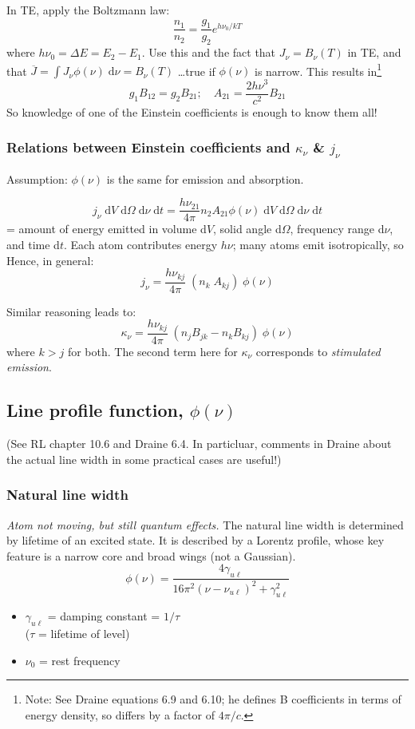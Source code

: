 \documentclass[11pt]{article}
\newcommand{\mar}[1]{\hspace{0pt}\marginpar{-\textcolor{black}{#1}-}}
\newcommand{\mynotes}[1]{{\fontfamily{cmss}\selectfont \textit{#1}}}
\begin{document}
\mar{30}In TE, apply the Boltzmann law:
\[
    \frac{n_{1}}{n_{2}} = \frac{g_{1}}{g_{2}} e^{h\nu_{0} / kT}
    \]
where $h\nu_{0} = \Delta{E} = E_{2} - E_{1}$.
Use this and the fact that $J_{\nu} = B_{\nu}(T)$ in TE, and that
$\overline{J} = \int J_{\nu} \phi(\nu)\; \mathrm{d}\nu = B_{\nu}(T)$
\ldots true if $\phi(\nu)$ is narrow. This results in\footnote{
    Note: See Draine equations 6.9 and 6.10; he defines B coefficients
    in terms of energy density, so differs by a factor of $4\pi/c$.}
\[
    g_{1} B_{12} = g_{2} B_{21}; \quad
    A_{21} = \frac{2h\nu^{3}}{c^{2}} B_{21}
    \]
So knowledge of one of the Einstein coefficients is enough to know
them all!

\subsubsection{Relations between Einstein coefficients and
$\kappa_{\nu}$ \& $j_{\nu}$}
Assumption: $\phi(\nu)$ is the same for emission and absorption.

\[
    j_{\nu} \;\mathrm{d}V \;\mathrm{d}\Omega \;\mathrm{d}\nu \;\mathrm{d}t
    = \frac{h\nu_{21}}{4\pi} n_{2} A_{21} \phi(\nu) \;
    \mathrm{d}V \;\mathrm{d}\Omega \;\mathrm{d}\nu \;\mathrm{d}t
    \]
= amount of energy emitted in volume d$V$, solid angle d$\Omega$,
frequency range d$\nu$, and time d$t$.
Each atom contributes energy $h\nu$; many atoms emit isotropically, so
Hence, in general:
\[
    \boxed{ j_{\nu} = \frac{h\nu_{kj}}{4\pi}\; (n_{k}\; A_{kj})\; \phi(\nu) }
    \]

Similar reasoning leads to:
\[
    \boxed{ \kappa_{\nu} = \frac{h\nu_{kj}}{4\pi}\;
        (n_{j} B_{jk} - n_{k} B_{kj})\; \phi(\nu) }
    \]
where $ k > j $ for both. \mar{31}The second term here for $\kappa_{\nu}$
corresponds to \textit{stimulated emission}.

\subsection{Line profile function, $\phi(\nu)$}
(See RL chapter 10.6 and Draine 6.4. In particluar, comments in Draine about
the actual line width in some practical cases are useful!)

\subsubsection{Natural line width}
\mynotes{Atom not moving, but still quantum effects.}
The natural line width is determined by lifetime of an excited state.
It is described by a Lorentz profile, whose key feature is a narrow core and
broad wings (not a Gaussian).
\[
    \phi(\nu)
    = \frac{4\gamma_{u\ell}}{16\pi^{2} (\nu - \nu_{u\ell})^{2} +
    \gamma_{u\ell}^{2} }
    \]
\begin{itemize}
    \item $\gamma_{u\ell}$ = damping constant = $1/\tau$\\
        ($\tau$ = lifetime of level)
    \item $\nu_{0}$ = rest frequency
\end{itemize}
\end{document}
